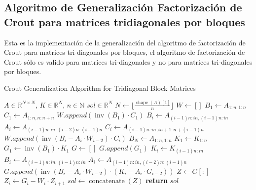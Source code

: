 \documentclass[a4paper]{article}
\begin{document}
\subsection{Algoritmo de Generalización Factorización de Crout para matrices tridiagonales por bloques}
Esta es la implementación de la generalización del algoritmo de factorización de Crout para matrices tri-diagonales por bloques, el algoritmo de factorización de Crout sólo es valido para matrices tri-diagonales y no para matrices tri-diagonales por bloques.
\begin{algorithm}[H]
\caption{Crout Generalization Algorithm for Tridiagonal Block Matrices}\label{alg::Crout}
\begin{algorithmic}[H]
\Require $A \in \mathbb{R}^{N \times N}$, $K \in \mathbb{R}^{N}$, $n \in \mathbb{N}$
\Ensure $sol \in \mathbb{R}^{N}$
\State $N \gets \lfloor \frac{\operatorname{shape}(A)[1]}{n} \rfloor$
\State $W \gets []$
\State $B_1 \gets A_{1:n,1:n}$
\State $C_1 \gets A_{1:n,n:n+n}$
\State $W.append(\operatorname{inv}(B_1) \cdot C_1)$
\State $B_i \gets A_{(i-1)n:in,(i-1)n:in}$
\State $A_i \gets A_{(i-1)n:in,(i-2)n:(i-1)n}$
\State $C_i \gets A_{(i-1)n:in,in+1:n+(i-1)n}$
\State $W.append(\operatorname{inv}(B_i - A_i \cdot W_{i-2}) \cdot C_i)$
\EndFor
\State $B_N \gets A_{1:n,1:n}$
\State $K_1 \gets K_{1:n}$
\State $G_1 \gets \operatorname{inv}(B_1) \cdot K_1$
\State $G \gets []$
\State $G.append(G_1)$
\State $K_i \gets K_{(i-1)n:in}$
\State $B_i \gets A_{(i-1)n:in,(i-1)n:in}$
\State $A_i \gets A_{(i-1)n:in,(i-2)n:(i-1)n}$
\State $G.append(\operatorname{inv}(B_i - A_i \cdot W_{i-2}) \cdot (K_i - A_i \cdot G_{i-2}))$
\EndFor
\State $Z \gets G[:]$
\State $Z_i \gets G_i - W_i \cdot Z_{i+1}$
\EndFor
\State $sol \gets \operatorname{concatenate}(Z)$
\State \textbf{return} $sol$
\EndFunction
\end{algorithmic}
\end{algorithm}
\end{document}
